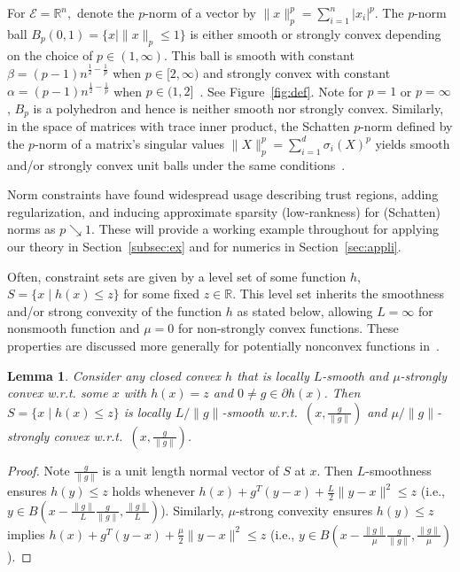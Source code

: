 \documentclass[sn-mathphys,Numbered]{sn-jnl}%
\newcommand{\RR}{\mathbb{R}}
\newtheorem{lemma}[theorem]{Lemma}%
\begin{document}
 For $\mathcal{E} = \RR^n,$ denote the $p$-norm of a vector by $\|x\|_p^p=\sum_{i=1}^n|x_i|^p$. The $p$-norm ball $B_p(0,1) = \{ x \mid \|x\|_p\leq 1\}$ is either smooth or strongly convex depending on the choice of $p\in(1,\infty)$. This ball is smooth with constant $\beta = (p-1)n^{\frac{1}{2}-\frac{1}{p}}$ when $p\in [2,\infty)$ and strongly convex with constant $\alpha= (p-1)n^{\frac{1}{2}-\frac{1}{p}}$ when $p\in (1,2]$~\cite[Lemma 3]{garber2015faster}. See Figure~\ref{fig:def}. Note for $p=1$ or $p=\infty$, $B_p$ is a polyhedron and hence is neither smooth nor strongly convex. Similarly, in the space of matrices with trace inner product, the Schatten $p$-norm defined by the $p$-norm of a matrix's singular values $\|X\|_p^p = \sum_{i=1}^d\sigma_i(X)^p$ yields smooth and/or strongly convex unit balls under the same conditions~\cite[Lemma 6]{garber2015faster}.

Norm constraints have found widespread usage describing trust regions, adding regularization, and inducing approximate sparsity (low-rankness) for (Schatten) norms as $p\searrow 1$. These will provide a working example throughout for applying our theory in Section~\ref{subsec:ex} and for numerics in Section~\ref{sec:appli}. %

 Often, constraint sets are given by a level set of some function $h$, $S=\{x \mid h(x) \leq z\}$ for some fixed $z\in\mathbb{R}$. This level set inherits the smoothness and/or strong convexity of the function $h$ as stated below, allowing $L=\infty$ for nonsmooth function and $\mu=0$ for non-strongly convex functions. These properties are discussed more generally for potentially nonconvex functions in~\cite[Proposition 4.14]{vial1983strong}.
\begin{lemma} \label{lemma:level}
    Consider any closed convex $h$ that is locally $L$-smooth and $\mu$-strongly convex w.r.t. some $x$ with $h(x)=z$ and $0\neq g\in \partial h(x)$. Then $S=\{x \mid h(x) \leq z\}$ is locally $L/\|g\|$-smooth w.r.t.~$(x,\frac{g}{\|g\|})$ and $\mu/\|g\|$-strongly convex w.r.t.~$(x,\frac{g}{\|g\|})$.
\end{lemma}
\begin{proof}
      Note $\frac{g}{\|g\|}$ is a unit length normal vector of $S$ at $x$. Then $L$-smoothness ensures $h(y) \leq z$ holds whenever $h(x) + g^T(y-x) + \frac{L}{2}\|y-x\|^2 \leq z$ (i.e., $y\in B(x - \frac{\|g\|}{L} \frac{g}{\|g\|}, \frac{\|g\|}{ L })$). Similarly, $\mu$-strong convexity ensures $h(y)\leq z$ implies $h(x) + g^T(y-x) + \frac{\mu}{2}\|y-x\|^2 \leq z$ (i.e., $y\in B(x - \frac{\|g\|}{\mu} \frac{g}{\|g\|}, \frac{\|g\|}{\mu})$).
\end{proof}
\end{document}
